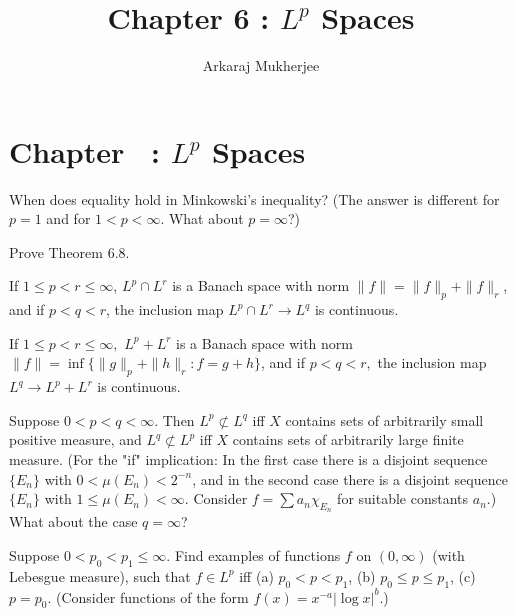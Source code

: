 \documentclass[12pt, a4paper]{article}
\title{\textbf{Chapter 6 : $L^p$ Spaces}}
\author{Arkaraj Mukherjee}
\begin{document}
\maketitle
\newpage
\tableofcontents
\newpage
\setcounter{section}{6}
\section*{Chapter \thesection\ : $L^p$ Spaces}
\begin{problem}\label{prob:6-1}
When does equality hold in Minkowski's inequality? (The answer is different for $p=1$ and for $1<p<\infty$. What about $p=\infty$?)
\end{problem}

\begin{problem}\label{prob:6-2}
Prove Theorem 6.8.
\end{problem}

\begin{problem}\label{prob:6-3}
If $1\le p<r\le\infty$, $L^{p}\cap L^{r}$ is a Banach space with norm $\|f\|=\|f\|_{p}+\|f\|_{r}$, and if $p<q<r$, the inclusion map $L^{p}\cap L^{r}\rightarrow L^{q}$ is continuous.
\end{problem}

\begin{problem}\label{prob:6-4}
If $1\le p<r\le\infty,$ $L^{p}+L^{r}$ is a Banach space with norm $\|f\|=\inf\{\|g\|_{p}+\|h\|_{r}: f=g+h\}$, and if $p<q<r,$ the inclusion map $L^{q}\rightarrow L^{p}+L^{r}$ is continuous.
\end{problem}

\begin{problem}\label{prob:6-5}
Suppose $0<p<q<\infty.$ Then $L^{p}\not\subset L^{q}$ iff $X$ contains sets of arbitrarily small positive measure, and $L^{q}\not\subset L^{p}$ iff $X$ contains sets of arbitrarily large finite measure. (For the "if" implication: In the first case there is a disjoint sequence $\{E_{n}\}$ with $0<\mu(E_{n})<2^{-n}$, and in the second case there is a disjoint sequence $\{E_{n}\}$ with $1\le\mu(E_{n})<\infty.$ Consider $f=\sum a_{n}\chi_{E_{n}}$ for suitable constants $a_{n}$.) What about the case $q=\infty$?
\end{problem}

\begin{problem}\label{prob:6-6}
Suppose $0<p_{0}<p_{1}\le\infty.$ Find examples of functions $f$ on $(0,\infty)$ (with Lebesgue measure), such that $f\in L^{p}$ iff (a) $p_{0}<p<p_{1}$, (b) $p_{0}\le p\le p_{1}$, (c) $p=p_{0}$. (Consider functions of the form $f(x)=x^{-a}|\log x|^{b}$.)
\end{problem}
\end{document}
